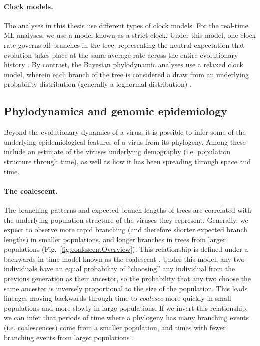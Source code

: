 \paragraph*{Clock models.}
The analyses in this thesis use different types of clock models.
For the real-time ML analyses, we use a model known as a strict clock.
Under this model, one clock rate governs all branches in the tree, representing the neutral expectation that evolution takes place at the same average rate across the entire evolutionary history \citep{kimura1968evolutionary}.
By contrast, the Bayesian phylodynamic analyses use a relaxed clock model, wherein each branch of the tree is considered a draw from an underlying probability distribution (generally a lognormal distribution) \citep{drummond2006relaxed}.

\subsection{Phylodynamics and genomic epidemiology}\label{ssec:phylodynamics}
Beyond the evolutionary dynamics of a virus, it is possible to infer some of the underlying epidemiological features of a virus from its phylogeny.
Among these include an estimate of the viruses underlying demography (i.e. population structure through time), as well as how it has been spreading through space and time.

\paragraph*{The coalescent.}
The branching patterns and expected branch lengths of trees are correlated with the underlying population structure of the viruses they represent.
Generally, we expect to observe more rapid branching (and therefore shorter expected branch lengths) in smaller populations, and longer branches in trees from larger populations (Fig.~\ref{fig:coalescentOverview}).
This relationship is defined under a backwards-in-time model known as the coalescent \citep{kingman1982coalescent,kingman1982genealogy}.
Under this model, any two individuals have an equal probability of ``choosing'' any individual from the previous generation as their ancestor, so the probability that any two choose the same ancestor is inversely proportional to the size of the population.
This leads lineages moving backwards through time to \textit{coalesce} more quickly in small populations and more slowly in large populations.
If we invert this relationship, we can infer that periods of time where a phylogeny has many branching events (i.e. coalescences) come from a smaller population, and times with fewer branching events from larger populations \citep{pybus2000integrated,drummond2005bayesian,minin2008smooth,gill2013improving}.

